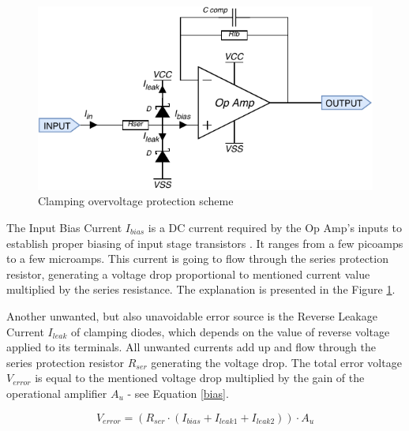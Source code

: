 \documentclass[12pt,a4paper]{article}
\begin{document}
\begin{figure}[ht!]
\includegraphics[scale=1.2]{input1.pdf}
\caption{Clamping overvoltage protection scheme}
\label{fig:input1}
\end{figure}

The Input Bias Current $I_{bias}$ is a DC current required by the Op Amp's inputs to establish proper biasing of input stage transistors \cite{companion}. It ranges from a few picoamps to a few microamps. This current is going to flow through the series protection resistor, generating a voltage drop proportional to mentioned current value multiplied by the series resistance. The explanation is presented in the Figure \ref{fig:input1}.
\par

Another unwanted, but also unavoidable error source is the Reverse Leakage Current $I_{leak}$ of clamping diodes, which depends on the value of reverse voltage applied to its terminals.
All unwanted currents add up and flow through the series protection resistor $R_{ser}$ generating the voltage drop. The total error voltage $V_{error}$ is equal to the mentioned voltage drop multiplied by the gain of the operational amplifier $A_u$ - see Equation \ref{bias}.

\begin{equation}
    V_{error} = (R_{ser} \cdot (I_{bias} + I_{leak1} +  I_{leak2})) \cdot A_u
    \label{bias}
\end{equation}
\par
\end{document}
